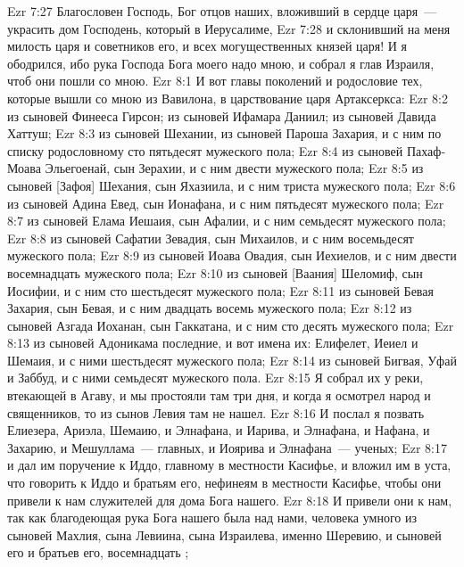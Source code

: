 \rsbpar\vs Ezr 7:27 Благословен Господь, Бог отцов наших, вложивший в сердце царя~--- украсить дом Господень, который в Иерусалиме,
\vs Ezr 7:28 и склонивший на меня милость царя и советников его, и всех могущественных князей царя! И я ободрился, ибо рука Господа Бога моего  надо мною, и собрал я глав Израиля, чтоб они пошли со мною.
\vs Ezr 8:1 И вот главы поколений и родословие тех, которые вышли со мною из Вавилона, в царствование царя Артаксеркса:
\vs Ezr 8:2 из сыновей Финееса Гирсон; из сыновей Ифамара Даниил; из сыновей Давида Хаттуш;
\vs Ezr 8:3 из сыновей Шехании, из сыновей Пароша Захария, и с ним по списку родословному сто пятьдесят  мужеского пола;
\vs Ezr 8:4 из сыновей Пахаф-Моава Эльегоенай, сын Зерахии, и с ним двести  мужеского пола;
\vs Ezr 8:5 из сыновей [Зафоя] Шехания, сын Яхазиила, и с ним триста  мужеского пола;
\vs Ezr 8:6 из сыновей Адина Евед, сын Ионафана, и с ним пятьдесят  мужеского пола;
\vs Ezr 8:7 из сыновей Елама Иешаия, сын Афалии, и с ним семьдесят  мужеского пола;
\vs Ezr 8:8 из сыновей Сафатии Зевадия, сын Михаилов, и с ним восемьдесят  мужеского пола;
\vs Ezr 8:9 из сыновей Иоава Овадия, сын Иехиелов, и с ним двести восемнадцать  мужеского пола;
\vs Ezr 8:10 из сыновей [Ваания] Шеломиф, сын Иосифии, и с ним сто шестьдесят  мужеского пола;
\vs Ezr 8:11 из сыновей Бевая Захария, сын Бевая, и с ним двадцать восемь  мужеского пола;
\vs Ezr 8:12 из сыновей Азгада Иоханан, сын Гаккатана, и с ним сто десять  мужеского пола;
\vs Ezr 8:13 из сыновей Адоникама последние, и вот имена их: Елифелет, Иеиел и Шемаия, и с ними шестьдесят  мужеского пола;
\vs Ezr 8:14 из сыновей Бигвая, Уфай и Заббуд, и с ними семьдесят  мужеского пола.
\rsbpar\vs Ezr 8:15 Я собрал их у реки, втекающей в Агаву, и мы простояли там три дня, и когда я осмотрел народ и священников, то из сынов Левия  там не нашел.
\vs Ezr 8:16 И послал я позвать Елиезера, Ариэла, Шемаию, и Элнафана, и Иарива, и Элнафана, и Нафана, и Захарию, и Мешуллама~--- главных, и Иоярива и Элнафана~--- ученых;
\vs Ezr 8:17 и дал им поручение к Иддо, главному в местности Касифье, и вложил им в уста, что говорить к Иддо и братьям его, нефинеям в местности Касифье, чтобы они привели к нам служителей для дома Бога нашего.
\vs Ezr 8:18 И привели они к нам, так как благодеющая рука Бога нашего была над нами, человека умного из сыновей Махлия, сына Левиина, сына Израилева, именно Шеревию, и сыновей его и братьев его, восемнадцать ;
